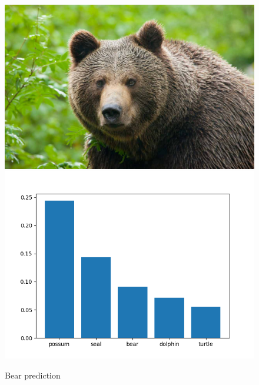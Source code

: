 \documentclass[12pt,english]{article}
\begin{document}
\begin{figure}[H]
\centering
\includegraphics[scale=0.1]{bear.jpg}
\includegraphics[scale=0.75]{bear_prediction.png}
\caption{Bear prediction}
\end{figure}
\end{document}
